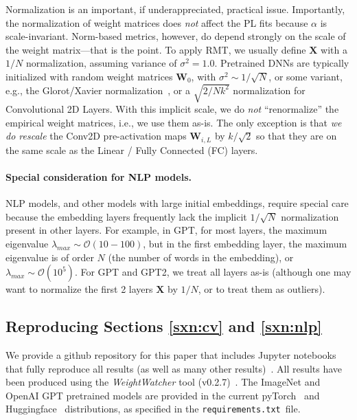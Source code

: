 Normalization is an important, if underappreciated, practical issue.
Importantly, the normalization of weight matrices does \emph{not} affect the PL fits because $\alpha$ is scale-invariant.
Norm-based metrics, however, do depend strongly on the scale of the weight matrix---that is the point.
To apply RMT, we usually define $\mathbf{X}$ with a $1/N$ normalization, assuming variance of $\sigma^{2}=1.0$.
Pretrained DNNs are typically initialized with random weight matrices $\mathbf{W}_{0}$, with
 $\sigma^{2}\sim 1/\sqrt{N}$, or some variant, e.g., the Glorot/Xavier normalization~\cite{GloBen10}, or a $\sqrt{2/Nk^2}$ normalization for Convolutional 2D Layers. With this implicit scale, 
we do \emph{not} ``renormalize'' the empirical weight matrices, i.e., we use them as-is.
The only exception is that \emph{we do rescale} the Conv2D pre-activation maps $\mathbf{W}_{i,L}$ 
by $k/\sqrt{2}$ so that they are on the same scale as the Linear / Fully Connected (FC) layers.


\paragraph{Special consideration for NLP models.}

NLP models, and other models with large initial embeddings, require special care because the embedding layers frequently lack the implicit $1/\sqrt{N}$ normalization present in other layers.
For example, in GPT, for most layers, the maximum eigenvalue $\lambda_{max}\sim\mathcal{O}(10-100)$, but in the first embedding layer, the maximum eigenvalue is of order $N$ (the number of words in the embedding), or $\lambda_{max}\sim\mathcal{O}(10^{5})$.  
For GPT and GPT2, we treat all layers as-is (although one may want to normalize the first 2 layers $\mathbf{X}$ by $1/N$, or to treat them as outliers).


\subsection{Reproducing Sections \ref{sxn:cv} and \ref{sxn:nlp} }   

We provide a github repository for this paper that includes Jupyter notebooks that fully reproduce all results (as well as many other results)~\cite{kdd20_sub_repo}.
All results have been produced using the \emph{WeightWatcher} tool (v0.2.7)~\cite{weightwatcher_package}.
The ImageNet and OpenAI GPT pretrained models are provided in the current 
pyTorch~\cite{pytorch} and Huggingface~\cite{huggingface} distributions, as specified in the \texttt{requirements.txt}~file. 

